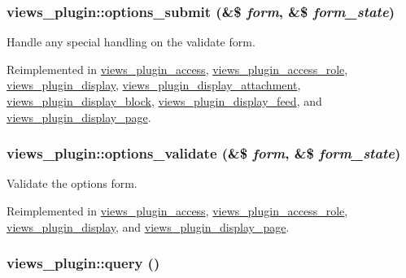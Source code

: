 {\subsubsection[{options\_\-submit}]{\setlength{\rightskip}{0pt plus 5cm}views\_\-plugin::options\_\-submit (\&\$ {\em form}, \/  \&\$ {\em form\_\-state})}}
\label{classviews__plugin_442b0f392deb52725ec8159e05654e06}


Handle any special handling on the validate form. 

Reimplemented in \hyperlink{classviews__plugin__access_d0610dfaa0e225c5d2cd85c7a13287fd}{views\_\-plugin\_\-access}, \hyperlink{classviews__plugin__access__role_d9bf6eddd91a7c224fb813a58077ee4d}{views\_\-plugin\_\-access\_\-role}, \hyperlink{classviews__plugin__display_75f0b2d5587b365640fcb4d414daae36}{views\_\-plugin\_\-display}, \hyperlink{classviews__plugin__display__attachment_63219dfd2bfed59bdf1840d704d11799}{views\_\-plugin\_\-display\_\-attachment}, \hyperlink{classviews__plugin__display__block_aac31f678cc192896bcfdeb1a8a5a2c7}{views\_\-plugin\_\-display\_\-block}, \hyperlink{classviews__plugin__display__feed_b7cca15934456ddb26045f03483899fb}{views\_\-plugin\_\-display\_\-feed}, and \hyperlink{classviews__plugin__display__page_9b03d35a15fcfcae4a474ea56b6ca5b6}{views\_\-plugin\_\-display\_\-page}.\hypertarget{classviews__plugin_46d72eb35feea36fed83cd1355a47431}{
\subsubsection[{options\_\-validate}]{\setlength{\rightskip}{0pt plus 5cm}views\_\-plugin::options\_\-validate (\&\$ {\em form}, \/  \&\$ {\em form\_\-state})}}
\label{classviews__plugin_46d72eb35feea36fed83cd1355a47431}


Validate the options form. 

Reimplemented in \hyperlink{classviews__plugin__access_1ac0bea409be6ef8d7eb4bfafcf760c6}{views\_\-plugin\_\-access}, \hyperlink{classviews__plugin__access__role_82fda91cd55acbbcac1759448c8fc471}{views\_\-plugin\_\-access\_\-role}, \hyperlink{classviews__plugin__display_0b4336df4db25dec552de8d20141a9f5}{views\_\-plugin\_\-display}, and \hyperlink{classviews__plugin__display__page_192c8feb8740fdb389600fb7a8588c27}{views\_\-plugin\_\-display\_\-page}.\hypertarget{classviews__plugin_10ac07c47c4a8735786f9fcc38548587}{
\subsubsection[{query}]{\setlength{\rightskip}{0pt plus 5cm}views\_\-plugin::query ()}}
\label{classviews__plugin_10ac07c47c4a8735786f9fcc38548587}



